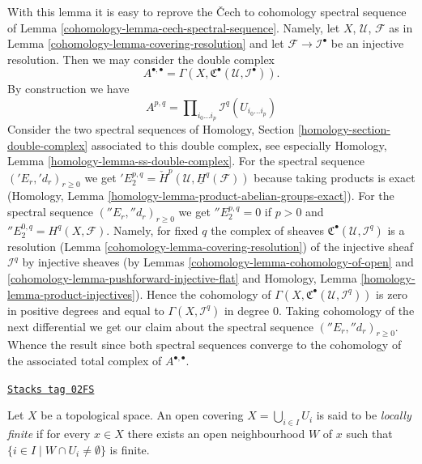 With this lemma it is easy to reprove the {\v C}ech to cohomology spectral
sequence of Lemma \ref{cohomology-lemma-cech-spectral-sequence}. Namely,
let $X$, $\mathcal{U}$, $\mathcal{F}$ as in
Lemma \ref{cohomology-lemma-covering-resolution}
and let $\mathcal{F} \to \mathcal{I}^\bullet$ be an injective resolution.
Then we may consider the double complex
$$
A^{\bullet, \bullet} =
\Gamma(X, {\mathfrak C}^\bullet(\mathcal{U}, \mathcal{I}^\bullet)).
$$
By construction we have
$$
A^{p, q} = \prod\nolimits_{i_0 \ldots i_p} \mathcal{I}^q(U_{i_0 \ldots i_p})
$$
Consider the two spectral sequences of
Homology, Section \ref{homology-section-double-complex} associated
to this double complex, see especially
Homology, Lemma \ref{homology-lemma-ss-double-complex}.
For the spectral sequence $({}'E_r, {}'d_r)_{r \geq 0}$ we get
${}'E_2^{p, q} = \check{H}^p(\mathcal{U}, \underline{H}^q(\mathcal{F}))$
because taking products is exact
(Homology, Lemma \ref{homology-lemma-product-abelian-groups-exact}).
For the spectral sequence $({}''E_r, {}''d_r)_{r \geq 0}$ we get
${}''E_2^{p, q} = 0$ if $p > 0$ and ${}''E_2^{0, q} = H^q(X, \mathcal{F})$.
Namely, for fixed $q$ the complex of sheaves
${\mathfrak C}^\bullet(\mathcal{U}, \mathcal{I}^q)$
is a resolution (Lemma \ref{cohomology-lemma-covering-resolution})
of the injective sheaf $\mathcal{I}^q$
by injective sheaves (by Lemmas \ref{cohomology-lemma-cohomology-of-open} and
\ref{cohomology-lemma-pushforward-injective-flat}
and
Homology, Lemma \ref{homology-lemma-product-injectives}).
Hence the cohomology of
$\Gamma(X, {\mathfrak C}^\bullet(\mathcal{U}, \mathcal{I}^q))$
is zero in positive degrees and equal to $\Gamma(X, \mathcal{I}^q)$
in degree $0$. Taking cohomology of the next differential
we get our claim about the spectral sequence $({}''E_r, {}''d_r)_{r \geq 0}$.
Whence the result since both spectral sequences converge to the
cohomology of the associated total complex of $A^{\bullet, \bullet}$.

\begin{definition}
\label{cohomology-definition-covering-locally-finite}
\href{https://stacks.math.columbia.edu/tag/02FS}{\texttt{Stacks tag 02FS}}

Let $X$ be a topological space.
An open covering $X = \bigcup_{i \in I} U_i$ is said to be
{\it locally finite} if for every $x \in X$ there exists an open neighbourhood
$W$ of $x$ such that $\{i \in I \mid W \cap U_i \not = \emptyset\}$ is finite.
\end{definition}


